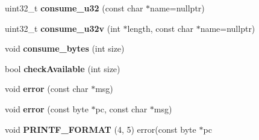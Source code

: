 \begin{DoxyCompactItemize}
\item 
uint32\+\_\+t {\bfseries consume\+\_\+u32} (const char $\ast$name=nullptr)\hypertarget{classv8_1_1internal_1_1wasm_1_1_decoder_a054cedf3bb3d425e384fc96c34cde417}{}\label{classv8_1_1internal_1_1wasm_1_1_decoder_a054cedf3bb3d425e384fc96c34cde417}

\item 
uint32\+\_\+t {\bfseries consume\+\_\+u32v} (int $\ast$length, const char $\ast$name=nullptr)\hypertarget{classv8_1_1internal_1_1wasm_1_1_decoder_aa3bf4aa1f2932bf1127c9e091ee8a709}{}\label{classv8_1_1internal_1_1wasm_1_1_decoder_aa3bf4aa1f2932bf1127c9e091ee8a709}

\item 
void {\bfseries consume\+\_\+bytes} (int size)\hypertarget{classv8_1_1internal_1_1wasm_1_1_decoder_a70ada731b5665fff490346d05c0bbfa4}{}\label{classv8_1_1internal_1_1wasm_1_1_decoder_a70ada731b5665fff490346d05c0bbfa4}

\item 
bool {\bfseries check\+Available} (int size)\hypertarget{classv8_1_1internal_1_1wasm_1_1_decoder_acec73f0eed5012ec33fa4acf4649a067}{}\label{classv8_1_1internal_1_1wasm_1_1_decoder_acec73f0eed5012ec33fa4acf4649a067}

\item 
void {\bfseries error} (const char $\ast$msg)\hypertarget{classv8_1_1internal_1_1wasm_1_1_decoder_a8de1515317bff5dc875a702f2007e13f}{}\label{classv8_1_1internal_1_1wasm_1_1_decoder_a8de1515317bff5dc875a702f2007e13f}

\item 
void {\bfseries error} (const byte $\ast$pc, const char $\ast$msg)\hypertarget{classv8_1_1internal_1_1wasm_1_1_decoder_ada714b098cf1976c6634b90622a420fe}{}\label{classv8_1_1internal_1_1wasm_1_1_decoder_ada714b098cf1976c6634b90622a420fe}

\item 
void {\bfseries P\+R\+I\+N\+T\+F\+\_\+\+F\+O\+R\+M\+AT} (4, 5) error(const byte $\ast$pc\hypertarget{classv8_1_1internal_1_1wasm_1_1_decoder_ad0bdae22728deb3b9061732598c1db84}{}\label{classv8_1_1internal_1_1wasm_1_1_decoder_ad0bdae22728deb3b9061732598c1db84}

\end{DoxyCompactItemize}
